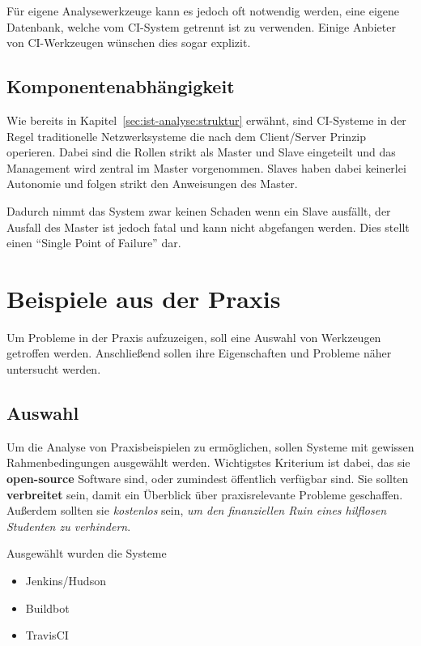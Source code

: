 Für eigene Analysewerkzeuge kann es jedoch oft notwendig werden,
eine eigene Datenbank, welche vom CI-System getrennt ist zu verwenden.
Einige Anbieter von CI-Werkzeugen wünschen dies sogar explizit.


\subsection{Komponentenabhängigkeit}

Wie bereits in Kapitel~\ref{sec:ist-analyse:struktur} erw\"ahnt,
sind CI-Systeme in der Regel traditionelle Netzwerksysteme die nach dem Client/Server Prinzip operieren.
Dabei sind die Rollen strikt als Master und Slave eingeteilt
und das Management wird zentral im Master vorgenommen.
Slaves haben dabei keinerlei Autonomie und folgen strikt den Anweisungen des Master.

Dadurch nimmt das System zwar keinen Schaden wenn ein Slave ausfällt,
der Ausfall des Master ist jedoch fatal und kann nicht abgefangen werden.
Dies stellt einen ``Single Point of Failure'' dar.


\section{Beispiele aus der Praxis}

Um Probleme in der Praxis aufzuzeigen,
soll eine Auswahl von Werkzeugen getroffen werden.
Anschließend sollen ihre Eigenschaften und Probleme
näher untersucht werden.


\subsection{Auswahl}

Um die Analyse von Praxisbeispielen zu ermöglichen,
sollen Systeme mit gewissen Rahmenbedingungen ausgew\"ahlt werden.
Wichtigstes Kriterium ist dabei, das sie \textbf{open-source} Software sind,
oder zumindest öffentlich verfügbar sind.
Sie sollten \textbf{verbreitet} sein, damit ein Überblick
über praxisrelevante Probleme geschaffen.
Außerdem sollten sie \textit{kostenlos} sein,
\textit{um den finanziellen Ruin eines hilflosen Studenten zu verhindern}.

Ausgewählt wurden die Systeme
\begin{itemize}
  \item Jenkins/Hudson
  \item Buildbot
  \item TravisCI
\end{itemize}

